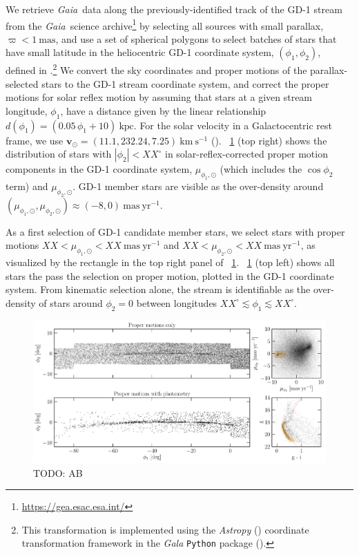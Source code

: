\documentclass[modern]{aastex62}
\newcommand{\package}[1]{\textsl{#1}}
\newcommand{\gaia}{\textsl{Gaia}}
\newcommand{\kms}{\ensuremath{\textrm{km}~\textrm{s}^{-1}}}
\newcommand{\bs}[1]{\boldsymbol{#1}}
\newcommand{\masyr}{\ensuremath{\textrm{mas}~\textrm{yr}^{-1}}}
\newcommand{\todo}[1]{{\color{red} TODO: #1}}
\begin{document}
We retrieve \gaia\ data along the previously-identified track of the GD-1 stream
from the \gaia\ science archive\footnote{\url{https://gea.esac.esa.int/}} by
selecting all sources with small parallax, $\varpi < 1~\textrm{mas}$, and use a
set of spherical polygons to select batches of stars that have small latitude in
the heliocentric GD-1 coordinate system, $(\phi_1, \phi_2)$, defined in
\cite{Koposov:2010}.\footnote{This transformation is implemented using the
\package{Astropy} (\citealt{astropy}) coordinate transformation framework in the
\package{Gala} \texttt{Python} package (\citealt{gala}).}
We convert the sky coordinates and proper motions of the parallax-selected stars
to the GD-1 stream coordinate system, and correct the proper motions for solar
reflex motion by assuming that stars at a given stream longitude, $\phi_1$, have
a distance given by the linear relationship $d(\phi_1) = (0.05 \, \phi_1 +
10)~\textrm{kpc}$.
For the solar velocity in a Galactocentric rest frame, we use $\bs{v}_\odot =
(11.1, 232.24, 7.25)~\kms$ (\citealt{Schonrich:2010, Bovy:2015}).
\figurename~\ref{fig:selection} (top right) shows the distribution of stars with
$|\phi_2| < XX^\circ$ in solar-reflex-corrected proper motion components in the
GD-1 coordinate system, $\mu_{\phi_1, \odot}$ (which includes the $\cos{\phi_2}$
term) and $\mu_{\phi_2, \odot}$.
GD-1 member stars are visible as the over-density around
$(\mu_{\phi_1, \odot}, \mu_{\phi_2, \odot}) \approx (-8, 0)~\masyr$.

As a first selection of GD-1 candidate member stars, we select stars with proper
motions $XX < \mu_{\phi_1, \odot} < XX~\masyr$ and $XX < \mu_{\phi_2, \odot} <
XX~\masyr$, as visualized by the rectangle in the top right panel of
\figurename~\ref{fig:selection}.
\figurename~\ref{fig:selection} (top left) shows all stars the pass the
selection on proper motion, plotted in the GD-1 coordinate system.
From kinematic selection alone, the stream is identifiable as the over-density
of stars around $\phi_2 = 0$ between longitudes $XX^\circ \lesssim \phi_1
\lesssim XX^\circ$.

\begin{figure}[h]
\begin{center}
\includegraphics[width=\textwidth]{gd1_sample.pdf}
\end{center}
\caption{
    \todo{AB}
\label{fig:selection}
}
\end{figure}
\end{document}
